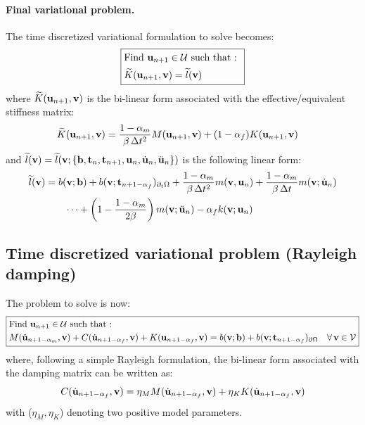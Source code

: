 \documentclass{report}
\newcommand{\bb}{\textbf{b}}
\newcommand{\bu}{\textbf{u}}
\newcommand{\bv}{\textbf{v}}
\newcommand{\bt}{\boldsymbol t}
\def\bb{{\bf{b}}}
\def\bt{{\bf t}}
\def\bu{{\bf{u}}}
\def\bv{{\bf{v}}}
\begin{document}
\paragraph{Final variational problem.}

The time discretized variational formulation to solve becomes:
\begin{equation}
\boxed{\begin{aligned} & \text{Find \ensuremath{\bu_{n+1}\ensuremath{\in}\ensuremath{\mathcal{U}}} such that : }\\
 & \widetilde{K}({\bu_{n+1}},\bv)=\widetilde{l}(\bv)
\end{aligned}
}
\end{equation}
where $ \widetilde{K}({\bu_{n+1}},\bv)$ is the bi-linear form associated with
the effective/equivalent stiffness matrix:
\begin{equation}
\begin{aligned}\widetilde{K}({\bu_{n+1}},\bv) & =\frac{1-\alpha_{m}}{\beta\,\Delta t^{2}}M(\bu_{n+1},\bv)+(1-\alpha_{f})K(\bu_{n+1},\bv)\end{aligned}
\end{equation}
and $\widetilde{l}(\bv)=\widetilde{l}(\bv;\left\{ \bb,\bt_{n},\bt_{n+1},\bu_{n},\dot{\bu}_{n},\ddot{\bu}_{n}\right\} )$
is the following linear form:
\begin{equation}
\begin{aligned}\widetilde{l}(\bv) & =b(\bv;\bb)+b(\bv;\bt_{n+1-\alpha_{f}})_{\partial_{t}\Omega}+\frac{1-\alpha_{m}}{\beta\,\Delta t^{2}}m(\bv,\bu_{n})+\frac{1-\alpha_{m}}{\beta\,\Delta t}m(\bv;\dot{\bu}_{n})\\
 & \qquad\cdots+\left(1-\frac{1-\alpha_{m}}{2\beta}\right)m(\bv;\ddot{\bu}_{n})-\alpha_{f}k(\bv;{\bu_{n}})
\end{aligned}
\end{equation}


\subsection{Time discretized variational problem (Rayleigh damping)}

The problem to solve is now:
\begin{equation}
\boxed{\begin{aligned} & \text{Find \ensuremath{\bu_{n+1}\ensuremath{\in}\ensuremath{\mathcal{U}}} such that : }\\
 & M(\ddot{\bu}_{n+1-\alpha_{m}},\bv)+C(\dot{\bu}_{n+1-\alpha_{f}},\bv)+K(\bu_{n+1-\alpha_{f}},\bv)=b(\bv;\bb)+b(\bv;\bt_{n+1-\alpha_{f}})_{\partial\Omega}\quad\text{\ensuremath{\forall\,}}\bv\in\mathcal{V}
\end{aligned}
}\label{eq:variational_pb_damping_1}
\end{equation}
where, following a simple Rayleigh formulation, the bi-linear form associated with the damping matrix can be written as:
\begin{equation}
C(\dot{\bu}_{n+1-\alpha_{f}},\bv)=\eta_{M}M(\dot{\bu}_{n+1-\alpha_{f}},\bv)+\eta_{K}K(\dot{\bu}_{n+1-\alpha_{f}},\bv)
\end{equation}
with ($\eta_{M},\eta_{K}$) denoting two positive model parameters.
\end{document}
